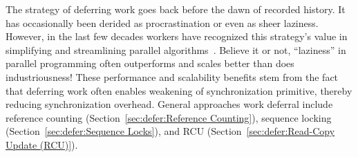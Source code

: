 

The strategy of deferring work goes back before the dawn of recorded
history. It has occasionally been derided as procrastination or
even as sheer laziness.
However, in the last few decades workers have recognized this strategy's value
in simplifying and streamlining parallel algorithms~\cite{Kung80,HMassalinPhD}.
Believe it or not, ``laziness'' in parallel programming often outperforms and
scales better than does industriousness!
These performance and scalability benefits stem from the fact that
deferring work often enables weakening of synchronization primitive,
thereby reducing synchronization overhead.
General approaches work deferral include
reference counting (Section~\ref{sec:defer:Reference Counting}),
sequence locking (Section~\ref{sec:defer:Sequence Locks}),
and RCU (Section~\ref{sec:defer:Read-Copy Update (RCU)}).








